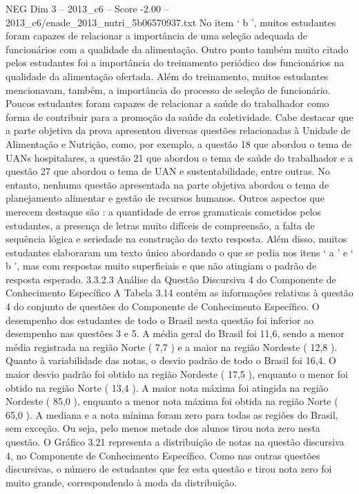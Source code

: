\begin{textsample}{NEG Dim 3 – 2013\_c6 – Score -2.00 – 2013\_c6/enade\_2013\_nutri\_5b06570937.txt}
No item ‘ b ’, muitos estudantes foram capazes de relacionar a importância de uma seleção adequada de funcionários com a qualidade da alimentação.
Outro ponto também muito citado pelos estudantes foi a importância do treinamento periódico dos funcionários na qualidade da alimentação ofertada.
Além do treinamento, muitos estudantes mencionavam, também, a importância do processo de seleção de funcionário.
Poucos estudantes foram capazes de relacionar a saúde do trabalhador como forma de contribuir para a promoção da saúde da coletividade.
Cabe destacar que a parte objetiva da prova apresentou diversas questões relacionadas à Unidade de Alimentação e Nutrição, como, por exemplo, a questão 18 que abordou o tema de UANs hospitalares, a questão 21 que abordou o tema de saúde do trabalhador e a questão 27 que abordou o tema de UAN e sustentabilidade, entre outras.
No entanto, nenhuma questão apresentada na parte objetiva abordou o tema de planejamento alimentar e gestão de recursos humanos.
Outros aspectos que merecem destaque são : a quantidade de erros gramaticais cometidos pelos estudantes, a presença de letras muito difíceis de compreensão, a falta de sequência lógica e seriedade na construção do texto resposta.
Além disso, muitos estudantes elaboraram um texto único abordando o que se pedia nos itens ‘ a ’ e ‘ b ’, mas com respostas muito superficiais e que não atingiam o padrão de resposta esperado. 3.3.2.3 Análise da Questão Discursiva 4 do Componente de Conhecimento Específico A Tabela 3.14 contém as informações relativas à questão 4 do conjunto de questões do Componente de Conhecimento Específico.
O desempenho dos estudantes de todo o Brasil nesta questão foi inferior ao desempenho nas questões 3 e 5.
A média geral do Brasil foi 11,6, sendo a menor média registrada na região Norte ( 7,7 ) e a maior na região Nordeste ( 12,8 ).
Quanto à variabilidade das notas, o desvio padrão de todo o Brasil foi 16,4.
O maior desvio padrão foi obtido na região Nordeste ( 17,5 ), enquanto o menor foi obtido na região Norte ( 13,4 ).
A maior nota máxima foi atingida na região Nordeste ( 85,0 ), enquanto a menor nota máxima foi obtida na região Norte ( 65,0 ).
A mediana e a nota mínima foram zero para todas as regiões do Brasil, sem exceção.
Ou seja, pelo menos metade dos alunos tirou nota zero nesta questão.
O Gráfico 3.21 representa a distribuição de notas na questão discursiva 4, no Componente de Conhecimento Específico.
Como nas outras questões discursivas, o número de estudantes que fez esta questão e tirou nota zero foi muito grande, correspondendo à moda da distribuição.

\end{textsample}
